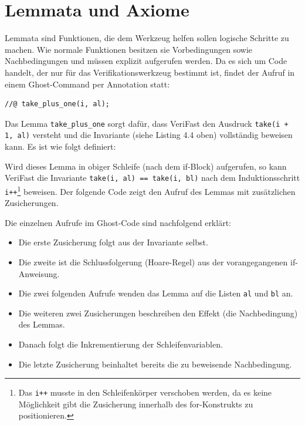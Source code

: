 \section{Lemmata und Axiome}
\label{verifizierung:lemma}

Lemmata sind Funktionen, die dem Werkzeug helfen sollen logische Schritte zu machen. Wie normale
Funktionen besitzen sie Vorbedingungen sowie Nachbedingungen und müssen explizit aufgerufen werden.
Da es sich um Code handelt, der nur für das Verifikationswerkzeug bestimmt ist, findet der Aufruf
in einem Ghost-Command per Annotation statt:

\lstset{frame=none}                      
\begin{lstlisting}
//@ take_plus_one(i, al);
\end{lstlisting}
\lstset{frame=single}    
Das Lemma \lstinline{take_plus_one} sorgt dafür, dass VeriFast den Ausdruck \lstinline{take(i + 1, al)}
versteht und die Invariante (siehe Listing 4.4 oben) vollständig beweisen kann. Es ist wie folgt
definiert:



Wird dieses Lemma in obiger Schleife (nach dem if-Block) aufgerufen, so kann VeriFast
die Invariante \lstinline{take(i, al) == take(i, bl)} nach dem Induktionsschritt \lstinline{i++}\footnote{Das 
\lstinline{i++} musste in den Schleifenkörper verschoben werden, da es keine  Möglichkeit gibt die Zusicherung 
innerhalb des for-Konstrukts zu positionieren.}
beweisen. Der folgende Code zeigt den Aufruf des Lemmas mit zusätzlichen Zusicherungen.



Die einzelnen Aufrufe im Ghost-Code sind nachfolgend erklärt:
\begin{itemize}
\item Die erste Zusicherung folgt aus der Invariante selbst.
\item Die zweite ist die Schlussfolgerung (Hoare-Regel) aus der vorangegangenen if-Anweisung.
\item Die zwei folgenden Aufrufe wenden das Lemma auf die Listen \lstinline{al} und \lstinline{bl} an.
\item Die weiteren zwei Zusicherungen beschreiben den Effekt (die Nachbedingung) des Lemmas.
\item Danach folgt die Inkrementierung der Schleifenvariablen.
\item Die letzte Zusicherung beinhaltet bereits die zu beweisende Nachbedingung.
\end{itemize}

